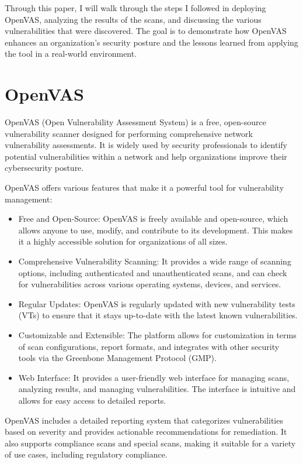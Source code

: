\documentclass[twocolumn]{article}
\begin{document}
Through this paper, I will walk through the steps I followed in deploying OpenVAS, analyzing the results of the scans, and discussing the various vulnerabilities that were discovered. The goal is to demonstrate how OpenVAS enhances an organization’s security posture and the lessons learned from applying the tool in a real-world environment.

\section{OpenVAS}

OpenVAS (Open Vulnerability Assessment System) is a free, open-source vulnerability scanner designed for performing comprehensive network vulnerability assessments. It is widely used by security professionals to identify potential vulnerabilities within a network and help organizations improve their cybersecurity posture.

OpenVAS offers various features that make it a powerful tool for vulnerability management:

\begin{itemize}
    \item Free and Open-Source: OpenVAS is freely available and open-source, which allows anyone to use, modify, and contribute to its development. This makes it a highly accessible solution for organizations of all sizes.
    \item Comprehensive Vulnerability Scanning: It provides a wide range of scanning options, including authenticated and unauthenticated scans, and can check for vulnerabilities across various operating systems, devices, and services.
    \item Regular Updates: OpenVAS is regularly updated with new vulnerability tests (VTs) to ensure that it stays up-to-date with the latest known vulnerabilities.
    \item Customizable and Extensible: The platform allows for customization in terms of scan configurations, report formats, and integrates with other security tools via the Greenbone Management Protocol (GMP).
    \item Web Interface: It provides a user-friendly web interface for managing scans, analyzing results, and managing vulnerabilities. The interface is intuitive and allows for easy access to detailed reports.
\end{itemize}

OpenVAS includes a detailed reporting system that categorizes vulnerabilities based on severity and provides actionable recommendations for remediation. It also supports compliance scans and special scans, making it suitable for a variety of use cases, including regulatory compliance.
\end{document}
